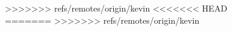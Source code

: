 \documentclass{nature}
\begin{document}
\begin{figure}[tb]
>>>>>>> refs/remotes/origin/kevin
%
<<<<<<< HEAD
=======
>>>>>>> refs/remotes/origin/kevin
%

\end{figure}
\end{document}
